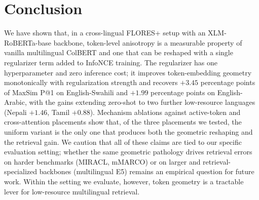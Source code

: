 \section{Conclusion}
\label{sec:conclusion}

We have shown that, in a cross-lingual FLORES+ setup with an XLM-RoBERTa-base backbone, token-level anisotropy is a measurable property of vanilla multilingual ColBERT and one that can be reshaped with a single regularizer term added to InfoNCE training. The regularizer has one hyperparameter and zero inference cost; it improves token-embedding geometry monotonically with regularization strength and recovers $+3.45$ percentage points of MaxSim P@1 on English-Swahili and $+1.99$ percentage points on English-Arabic, with the gains extending zero-shot to two further low-resource languages (Nepali $+1.46$, Tamil $+0.88$). Mechanism ablations against active-token and cross-attention placements show that, of the three placements we tested, the uniform variant is the only one that produces both the geometric reshaping and the retrieval gain. We caution that all of these claims are tied to our specific evaluation setting; whether the same geometric pathology drives retrieval errors on harder benchmarks (MIRACL, mMARCO) or on larger and retrieval-specialized backbones (multilingual E5) remains an empirical question for future work. Within the setting we evaluate, however, token geometry is a tractable lever for low-resource multilingual retrieval.
